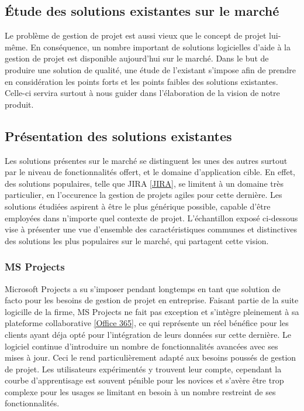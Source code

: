 \begin{spacing}{1.5}
\section{Étude des solutions existantes sur le marché}
Le problème de gestion de projet est aussi vieux que le concept de projet lui-même. En conséquence, un nombre important de solutions logicielles d'aide à la gestion de projet est disponible aujourd'hui sur le marché. Dans le but de produire une solution de qualité, une étude de l'existant s'impose afin de prendre en considération les points forts et les points faibles des solutions existantes. Celle-ci servira surtout à nous guider dans l'élaboration de la vision de notre produit.

\subsection{Présentation des solutions existantes}
Les solutions présentes sur le marché se distinguent les unes des autres surtout par le niveau de fonctionnalités offert, et le domaine d'application cible. En effet, des solutions populaires, telle que JIRA \ref{JIRA}, se limitent à un domaine très particulier, en l'occurence la gestion de projets agiles pour cette dernière. Les solutions étudiées aspirent à être le plus générique possible, capable d'être employées dans n'importe quel contexte de projet. L'échantillon exposé ci-dessous vise à présenter une vue d'ensemble des caractéristiques communes et distinctives des solutions les plus populaires sur le marché, qui partagent cette vision.

\subsubsection*{MS Projects} %
Microsoft Projects a su s'imposer pendant longtemps en tant que solution de facto pour les besoins de gestion de projet en entreprise. Faisant partie de la suite logicille de la firme, MS Projects ne fait pas exception et s'intègre pleinement à sa plateforme collaborative \ref{Office 365}, ce qui représente un réel bénéfice pour les clients ayant déja opté pour l'intégration de leurs données sur cette dernière. Le logiciel continue d'introduire un nombre de fonctionnalités avancées avec ses mises à jour. Ceci le rend particulièrement adapté aux besoins poussés de gestion de projet. Les utilisateurs expérimentés y trouvent leur compte, cependant la courbe d'apprentisage est souvent pénible pour les novices et s'avère être trop complexe pour les usages se limitant en besoin à un nombre restreint de ses fonctionnalités.


\end{spacing}
